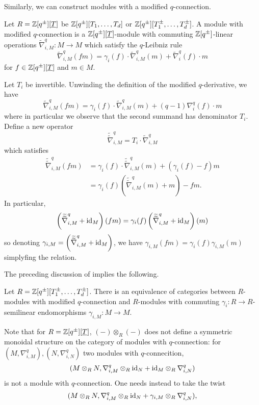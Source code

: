 Similarly, we can construct modules with a modified $q$-connection. 
\begin{definition}\label{def: modified q-connections on modules}
    Let $R=\mathbb{Z}[q^{\pm}][\underline{T}]$ be $\mathbb{Z}[q^{\pm}][T_{1},\dots,T_{d}]$ or $\mathbb{Z}[q^{\pm}][T_{1}^{\pm},\dots,T_{d}^{\pm}]$. A module with modified $q$-connection is a $\mathbb{Z}[q^{\pm}][\underline{T}]$-module with commuting $\mathbb{Z}[q^{\pm}]$-linear operations $\widetilde{\nabla}_{i,M}^{q}:M\to M$ which satisfy the $q$-Leibniz rule 
    $$\widetilde{\nabla}_{i,M}^{q}(fm)=\gamma_{i}(f)\cdot\widetilde{\nabla}_{i,M}^{q}(m)+\widetilde{\nabla}_{i}^{q}(f)\cdot m$$
    for $f\in \mathbb{Z}[q^{\pm}][\underline{T}]$ and $m\in M$.
\end{definition}
\begin{remark}\label{rmk: invertible case}
    Let $T_{i}$ be invertible. Unwinding the definition of the modified $q$-derivative, we have
    $$\widetilde{\nabla}_{i,M}^{q}(fm)=\gamma_{i}(f)\cdot\widetilde{\nabla}_{i,M}^{q}(m)+(q-1)\nabla_{i}^{q}(f)\cdot m$$
    where in particular we observe that the second summand has denominator $T_{i}$. Define a new operator 
    $$\widetilde{\widetilde{\nabla}}_{i,M}^{q}=T_{i}\cdot\widetilde{\nabla}_{i,M}^{q}$$
    which satisfies 
    \begin{align*}
        \widetilde{\widetilde{\nabla}}_{i,M}^{q}(fm) &= \gamma_{i}(f)\cdot\widetilde{\widetilde{\nabla}}_{i,M}^{q}(m)+(\gamma_{i}(f)-f)m \\
        &= \gamma_{i}(f)\left(\widetilde{\widetilde{\nabla}}_{i,M}^{q}(m)+m\right)-fm.
    \end{align*}
    In particular, 
    $$\left(\widetilde{\widetilde{\nabla}}_{i,M}^{q}+\mathrm{id}_{M}\right)(fm) = \gamma_{i}(f)\left(\widetilde{\widetilde{\nabla}}_{i,M}^{q}+\mathrm{id}_{M}\right)(m)$$
    so denoting $\gamma_{i,M}=\left(\widetilde{\widetilde{\nabla}}_{i,M}^{q}+\mathrm{id}_{M}\right)$, we have $\gamma_{i,M}(fm)=\gamma_{i}(f)\gamma_{i,M}(m)$ simplyfing the relation. 
\end{remark}
The preceding discussion of  implies the following. 
\begin{corollary}\label{corr: equivalence of q-connection modules and semilinear}
    Let $R=\mathbb{Z}[q^{\pm}][T_{1}^{\pm},\dots,T_{d}^{\pm}]$. There is an equivalence of categories between $R$-modules with modified $q$-connection and $R$-modules with commuting $\gamma_{i}:R\to R$-semilinear endomorphisms $\gamma_{i,M}:M\to M$. 
\end{corollary}
Note that for $R=\mathbb{Z}[q^{\pm}][\underline{T}]$, $(-)\otimes_{R}(-)$ does not define a symmetric monoidal structure on the category of modules with $q$-connection: for $(M,\nabla_{i,M}^{q}),(N,\nabla_{i,N}^{q})$ two modules with $q$-connecition, $$(M\otimes_{R} N,\nabla_{i,M}^{q}\otimes_{R}\mathrm{id}_{N}+\mathrm{id}_{M}\otimes_{R}\nabla_{i,N}^{q})$$ is not a module with $q$-connection. One needs instead to take the twist $$(M\otimes_{R} N,\nabla_{i,M}^{q}\otimes_{R}\mathrm{id}_{N}+\gamma_{i,M}\otimes_{R}\nabla_{i,N}^{q}),$$
